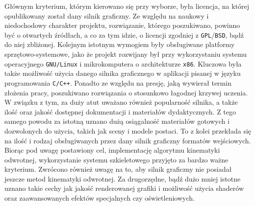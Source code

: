\documentclass[11pt]{mwrep}
\begin{document}
Głównym kryterium, którym kierowano się przy wyborze, była licencja, na której opublikowany został dany silnik graficzny. Ze względu na naukowy i niedochodowy charakter projektu, rozwiązanie, którego poszukiwano, powinno być o otwartych źródłach, a co za tym idzie, o licencji zgodniej z \texttt{GPL}/\texttt{BSD}, bądź do niej zbliżonej. Kolejnym istotnym wymogiem były obsługiwane platformy sprzętowo-sys\-te\-mo\-we, jako że projekt rozwijany był przy wykorzystaniu systemu operacyjnego \texttt{GNU/Linux} i mikrokomputera o architekturze \texttt{x86}. Kluczowa była także możliwość użycia danego silnika graficznego w aplikacji pisanej w języku programowania \texttt{C/C++}. Ponadto ze względu na presję, jaką wywierał termin złożenia pracy, poszukiwano rozwiązania o stosunkowo łagodnej krzywej uczenia. W związku z tym, za duży atut uważano również popularność silnika, a także ilość oraz jakość dostępnej dokumentacji i materiałów dydaktycznych. Z tego samego powodu za istotną uznano dużą osiągalność materiałów gotowych i dozwolonych do użycia, takich jak sceny i modele postaci. To z kolei przekłada się na ilość i rodzaj obsługiwanych przez dany silnik graficzny formatów wejściowych. Biorąc pod uwagę postawiony cel, implementację algorytmu kinematyki odwrotnej, wykorzystanie systemu szkieletowego przyjęto za bardzo ważne kryterium. Zwrócono również uwagę na to, aby silnik graficzny nie posiadał jeszcze metod kinematyki odwrotnej. Za drugorzędne, bądź dużo mniej istotne uznano takie cechy jak jakość renderowanej grafiki i możliwość użycia shaderów oraz zaawansowanych efektów specjalnych czy oświetleniowych.

\end{document}
